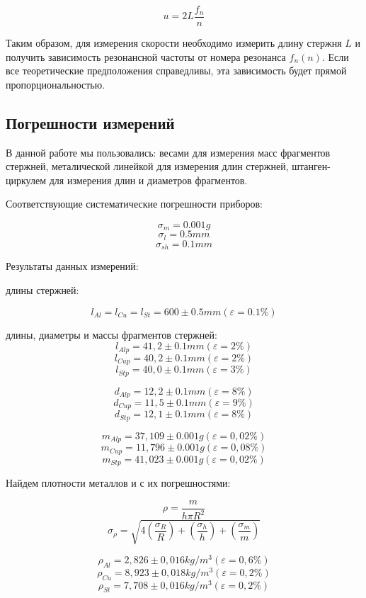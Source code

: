 \begin{equation} \label{ф от н}
    u = 2L\frac{f_n}{n}
\end{equation}
    
    Таким образом, для измерения скорости необходимо измерить длину стержня $L$ и получить зависимость резонансной частоты от номера резонанса $f_n(n)$. Если все теоретические предположения справедливы, эта зависимость будет прямой пропорциональностью.

    
\subsection{Погрешности измерений}

    В данной работе мы пользовались: 
    весами для измерения масс фрагментов стержней,
    металической линейкой для измерения длин стержней,
    штанген-циркулем для измерения длин и диаметров фрагментов.
    
    
    Соответствующие систематические погрешности приборов:
    
\[\sigma_{m} = 0.001 g\]
\[\sigma_{l} = 0.5 mm\]
\[\sigma_{sh} = 0.1 mm\]

    Результаты данных измерений:
    
    длины стержней:
    
\[l_{Al} = l_{Cu} = l_{St} = 600 \pm 0.5 mm  (\varepsilon = 0.1 \%)\]

    длины, диаметры и массы фрагментов стержней:
\[l_{Alp} = 41,2 \pm 0.1 mm  (\varepsilon = 2 \%)\]
\[l_{Cup} = 40,2 \pm 0.1 mm  (\varepsilon = 2 \%)\]
\[l_{Stp} = 40,0 \pm 0.1 mm  (\varepsilon = 3 \%)\]

\[d_{Alp} = 12,2 \pm 0.1 mm  (\varepsilon = 8 \%)\]
\[d_{Cup} = 11,5 \pm 0.1 mm  (\varepsilon = 9 \%)\]
\[d_{Stp} = 12,1 \pm 0.1 mm  (\varepsilon = 8 \%)\]

\[m_{Alp} = 37,109 \pm 0.001 g  (\varepsilon = 0,02 \%)\]
\[m_{Cup} = 11,796 \pm 0.001 g  (\varepsilon = 0,08 \%)\]
\[m_{Stp} = 41,023 \pm 0.001 g  (\varepsilon = 0,02 \%)\]


    Найдем плотности металлов и с их погрешностями:

\[\rho = \frac{m}{h\pi R^2}\]
\[\sigma_{\rho} = \sqrt{4\left(\frac{\sigma_R}{R}\right) + \left(\frac{\sigma_h}{h}\right) + \left(\frac{\sigma_m}{m}\right)}\]
    
\[\rho_{Al} = 2,826 \pm  0,016 kg/m^3 (\varepsilon = 0,6\%)\]
\[\rho_{Cu} = 8,923 \pm  0,018 kg/m^3 (\varepsilon = 0,2\%)\]
\[\rho_{St} = 7,708 \pm  0,016 kg/m^3 (\varepsilon = 0,2\%)\]


